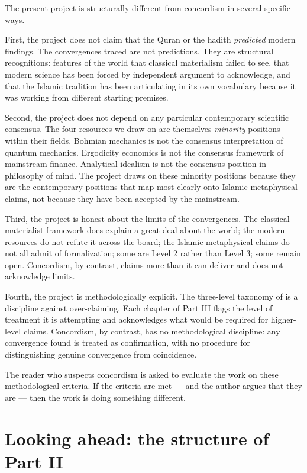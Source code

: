 The present project is structurally different from concordism in
several specific ways.

First, the project does not claim that the Quran or the hadith
\emph{predicted} modern findings. The convergences traced are not
predictions. They are structural recognitions: features of the
world that classical materialism failed to see, that modern science
has been forced by independent argument to acknowledge, and that the
Islamic tradition has been articulating in its own vocabulary because
it was working from different starting premises.

Second, the project does not depend on any particular contemporary
scientific consensus. The four resources we draw on are themselves
\emph{minority} positions within their fields. Bohmian mechanics is
not the consensus interpretation of quantum mechanics. Ergodicity
economics is not the consensus framework of mainstream finance.
Analytical idealism is not the consensus position in philosophy of
mind. The project draws on these minority positions because they are
the contemporary positions that map most clearly onto Islamic
metaphysical claims, not because they have been accepted by the
mainstream.

Third, the project is honest about the limits of the convergences.
The classical materialist framework does explain a great deal about
the world; the modern resources do not refute it across the board;
the Islamic metaphysical claims do not all admit of formalization;
some are Level 2 rather than Level 3; some remain open. Concordism,
by contrast, claims more than it can deliver and does not
acknowledge limits.

Fourth, the project is methodologically explicit. The three-level
taxonomy of  is a discipline against
over-claiming. Each chapter of Part III flags the level of treatment
it is attempting and acknowledges what would be required for higher-level
claims. Concordism, by contrast, has no methodological discipline:
any convergence found is treated as confirmation, with no procedure
for distinguishing genuine convergence from coincidence.

The reader who suspects concordism is asked to evaluate the work on
these methodological criteria. If the criteria are met --- and the
author argues that they are --- then the work is doing something
different.

\section{Looking ahead: the structure of Part II}
\label{sec:ahead-4}

